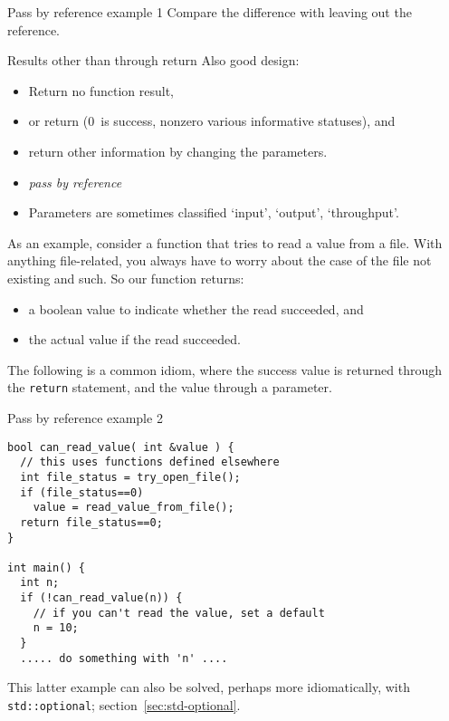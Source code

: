 \begin{block}{Pass by reference example 1}
  \label{sl:pass-reference1}
  Compare the difference with leaving out the reference.
\end{block}

\begin{slide}{Results other than through return}
  \label{sl:func-err-return}
  Also good design:
  \begin{itemize}
  \item Return no function result,
  \item or return  (0~is success, nonzero various
    informative statuses), and
  \item return other information by changing the parameters.
  \item \emph{pass by reference}
  \item Parameters are sometimes classified `input', `output', `throughput'.
  \end{itemize}
\end{slide}

As an example, consider a function that tries to read a value from a
file. With anything file-related, you always have to worry about the
case of the file not existing and such. So our function returns:
\begin{itemize}
\item a boolean value to indicate whether the read succeeded, and
\item the actual value if the read succeeded.
\end{itemize}
The following is a common idiom, where the success value is returned
through the \lstinline{return} statement, and the value through a parameter.

\begin{block}{Pass by reference example 2}
  \label{sl:pass-reference2}
\footnotesize
\begin{lstlisting}
bool can_read_value( int &value ) {
  // this uses functions defined elsewhere
  int file_status = try_open_file();
  if (file_status==0) 
    value = read_value_from_file();
  return file_status==0;
}

int main() {
  int n;
  if (!can_read_value(n)) {
    // if you can't read the value, set a default
    n = 10;
  }
  ..... do something with 'n' ....
\end{lstlisting}
\end{block}

This latter example can also be solved,
perhaps more idiomatically, with \lstinline+std::optional+;
section~\ref{sec:std-optional}.

